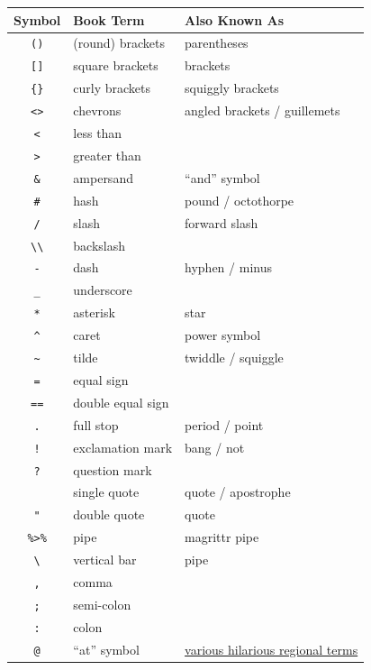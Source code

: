 \documentclass[
  oneside]{book}
\begin{document}
\begin{longtable}[]{@{}cll@{}}
\toprule
Symbol & Book Term & Also Known As \\
\midrule
\endhead
\texttt{()} & (round) brackets & parentheses \\
\texttt{{[}{]}} & square brackets & brackets \\
\texttt{\{\}} & curly brackets & squiggly brackets \\
\texttt{\textless{}\textgreater{}} & chevrons & angled brackets / guillemets \\
\texttt{\textless{}} & less than & \\
\texttt{\textgreater{}} & greater than & \\
\texttt{\&} & ampersand & ``and'' symbol \\
\texttt{\#} & hash & pound / octothorpe \\
\texttt{/} & slash & forward slash \\
\texttt{\textbackslash{}\textbackslash{}} & backslash & \\
\texttt{-} & dash & hyphen / minus \\
\texttt{\_} & underscore & \\
\texttt{*} & asterisk & star \\
\texttt{\^{}} & caret & power symbol \\
\texttt{\textasciitilde{}} & tilde & twiddle / squiggle \\
\texttt{=} & equal sign & \\
\texttt{==} & double equal sign & \\
\texttt{.} & full stop & period / point \\
\texttt{!} & exclamation mark & bang / not \\
\texttt{?} & question mark & \\
\texttt{\textquotesingle{}} & single quote & quote / apostrophe \\
\texttt{"} & double quote & quote \\
\texttt{\%\textgreater{}\%} & pipe & magrittr pipe \\
\texttt{\textbackslash{}\textbar{}} & vertical bar & pipe \\
\texttt{,} & comma & \\
\texttt{;} & semi-colon & \\
\texttt{:} & colon & \\
\texttt{@} & ``at'' symbol & \href{https://www.theguardian.com/notesandqueries/query/0,5753,-1773,00.html}{various hilarious regional terms} \\
\bottomrule
\end{longtable}
\end{document}

